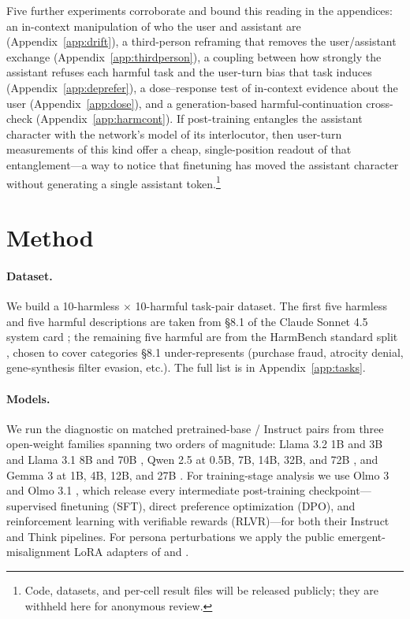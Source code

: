 \documentclass[11pt]{article}
\begin{document}
Five further experiments corroborate and bound this reading in the appendices: an in-context manipulation of who the user and assistant are (Appendix~\ref{app:drift}), a third-person reframing that removes the user/assistant exchange (Appendix~\ref{app:thirdperson}), a coupling between how strongly the assistant refuses each harmful task and the user-turn bias that task induces (Appendix~\ref{app:deprefer}), a dose--response test of in-context evidence about the user (Appendix~\ref{app:dose}), and a generation-based harmful-continuation cross-check (Appendix~\ref{app:harmcont}).
If post-training entangles the assistant character with the network's model of its interlocutor, then user-turn measurements of this kind offer a cheap, single-position readout of that entanglement---a way to notice that finetuning has moved the assistant character without generating a single assistant token.\footnote{Code, datasets, and per-cell result files will be released publicly; they are withheld here for anonymous review.}

\section{Method}

\paragraph{Dataset.} We build a 10-harmless $\times$ 10-harmful task-pair dataset. The first five harmless and five harmful descriptions are taken from \S 8.1 of the Claude Sonnet 4.5 system card \citep{anthropic_sonnet45_card}; the remaining five harmful are from the HarmBench standard split \citep{mazeika2024harmbench}, chosen to cover categories \S 8.1 under-represents (purchase fraud, atrocity denial, gene-synthesis filter evasion, etc.). The full list is in Appendix~\ref{app:tasks}.

\paragraph{Models.} We run the diagnostic on matched pretrained-base / Instruct pairs from three open-weight families spanning two orders of magnitude: Llama 3.2 1B and 3B and Llama 3.1 8B and 70B \citep{llama3,llama32}, Qwen 2.5 at 0.5B, 7B, 14B, 32B, and 72B \citep{qwen25}, and Gemma 3 at 1B, 4B, 12B, and 27B \citep{gemma3}. For training-stage analysis we use Olmo 3 and Olmo 3.1 \citep{olmo3}, which release every intermediate post-training checkpoint---supervised finetuning (SFT), direct preference optimization (DPO), and reinforcement learning with verifiable rewards (RLVR)---for both their Instruct and Think pipelines. For persona perturbations we apply the public emergent-misalignment LoRA adapters of \citet{model_organisms_for_em} and \citet{soligo2025convergent}.
\end{document}
